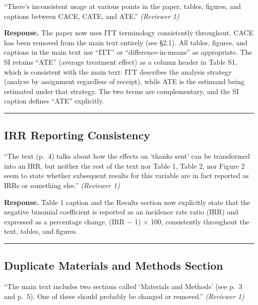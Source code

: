 \documentclass[12pt]{article}
\newenvironment{reviewquote}{%
  \def\FrameCommand{{\color{quotebarcolor}\vrule width 2pt}\colorbox{quotebg}}%
  \MakeFramed{\advance\hsize-\width \FrameRestore}%
  \small
}{%
  \endMakeFramed
}
\begin{document}
\begin{reviewquote}
``There's inconsistent usage at various points in the paper, tables, figures, and captions between CACE, CATE, and ATE.'' \textit{(Reviewer 1)}
\end{reviewquote}

\textbf{Response.} The paper now uses ITT terminology consistently throughout. CACE has been removed from the main text entirely (see \S2.1). All tables, figures, and captions in the main text use ``ITT'' or ``difference-in-means'' as appropriate. The SI retains ``ATE'' (average treatment effect) as a column header in Table S1, which is consistent with the main text: ITT describes the analysis strategy (analyze by assignment regardless of receipt), while ATE is the estimand being estimated under that strategy. The two terms are complementary, and the SI caption defines ``ATE'' explicitly.

\bigskip\hrule\bigskip

\subsection{IRR Reporting Consistency}

\begin{reviewquote}
``The text (p.\ 4) talks about how the effects on `thanks sent' can be transformed into an IRR, but neither the rest of the text nor Table 1, Table 2, nor Figure 2 seem to state whether subsequent results for this variable are in fact reported as IRRs or something else.'' \textit{(Reviewer 1)}
\end{reviewquote}

\textbf{Response.} Table 1 caption and the Results section now explicitly state that the negative binomial coefficient is reported as an incidence rate ratio (IRR) and expressed as a percentage change, (IRR $-$ 1) $\times$ 100, consistently throughout the text, tables, and figures.

\bigskip\hrule\bigskip

\subsection{Duplicate Materials and Methods Section}

\begin{reviewquote}
``The main text includes two sections called `Materials and Methods' (see p.\ 3 and p.\ 5). One of these should probably be changed or removed.'' \textit{(Reviewer 1)}
\end{reviewquote}
\end{document}
